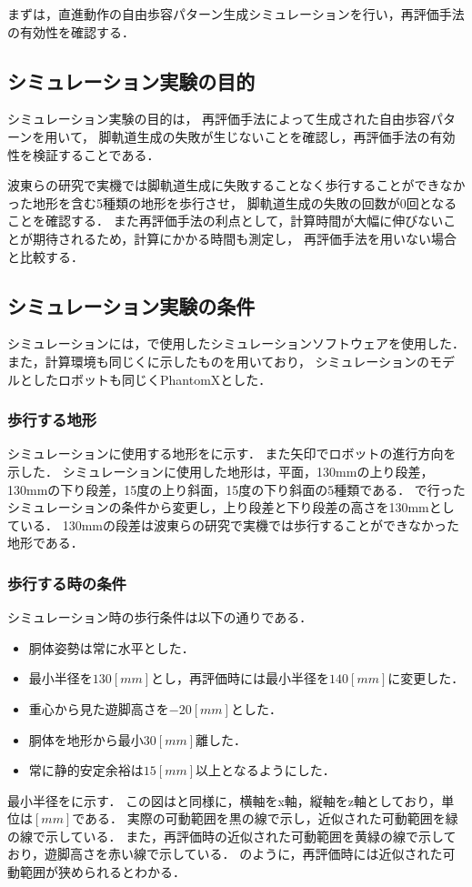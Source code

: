 まずは，直進動作の自由歩容パターン生成シミュレーションを行い，再評価手法の有効性を確認する．

\subsection{シミュレーション実験の目的}
シミュレーション実験の目的は，
再評価手法によって生成された自由歩容パターンを用いて，
脚軌道生成の失敗が生じないことを確認し，再評価手法の有効性を検証することである．

波東らの研究で実機では脚軌道生成に失敗することなく歩行することができなかった地形を含む5種類の地形を歩行させ，
脚軌道生成の失敗の回数が0回となることを確認する．
また再評価手法の利点として，計算時間が大幅に伸びないことが期待されるため，計算にかかる時間も測定し，
再評価手法を用いない場合と比較する．

\subsection{シミュレーション実験の条件}
シミュレーションには，で使用したシミュレーションソフトウェアを使用した．
また，計算環境も同じくに示したものを用いており，
シミュレーションのモデルとしたロボットも同じくPhantomXとした．

\subsubsection{歩行する地形}
シミュレーションに使用する地形をに示す．
また矢印でロボットの進行方向を示した．
シミュレーションに使用した地形は，平面，130mmの上り段差，130mmの下り段差，15度の上り斜面，15度の下り斜面の5種類である．
で行ったシミュレーションの条件から変更し，上り段差と下り段差の高さを130mmとしている．
130mmの段差は波東らの研究で実機では歩行することができなかった地形である．

\subsubsection{歩行する時の条件}
シミュレーション時の歩行条件は以下の通りである．
\begin{itemize}
  \item 胴体姿勢は常に水平とした．
  \item 最小半径を$130 [mm]$とし，再評価時には最小半径を$140 [mm]$に変更した．
  \item 重心から見た遊脚高さを$-20 [mm]$とした．
  \item 胴体を地形から最小$30 [mm]$離した．
  \item 常に静的安定余裕は$15 [mm]$以上となるようにした．
\end{itemize}
最小半径をに示す．
この図はと同様に，横軸をx軸，縦軸をz軸としており，単位は$[mm]$である．
実際の可動範囲を黒の線で示し，近似された可動範囲を緑の線で示している．
また，再評価時の近似された可動範囲を黄緑の線で示しており，遊脚高さを赤い線で示している．
のように，再評価時には近似された可動範囲が狭められるとわかる．

